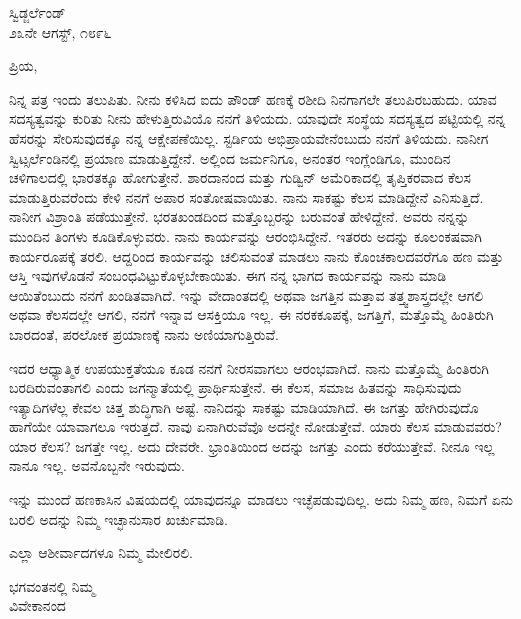 \vspace{-0.5cm}

\begin{flushright}
ಸ್ವಿಡ್ಜರ್ಲೆಂಡ್\\೨೩ನೇ ಆಗಸ್ಟ್, ೧೮೯೬
\end{flushright}

\noindent
ಪ್ರಿಯ,

ನಿನ್ನ ಪತ್ರ ಇಂದು ತಲುಪಿತು. ನೀನು ಕಳಿಸಿದ ಐದು ಪೌಂಡ್ ಹಣಕ್ಕೆ ರಶೀದಿ ನಿನಗಾಗಲೇ ತಲುಪಿರಬಹುದು. ಯಾವ ಸದಸ್ಯತ್ವವನ್ನು ಕುರಿತು ನೀನು ಹೇಳುತ್ತಿರುವಿಯೊ ನನಗೆ ತಿಳಿಯದು. ಯಾವುದೇ ಸಂಸ್ಥೆಯ ಸದಸ್ಯತ್ವದ ಪಟ್ಟಿಯಲ್ಲಿ ನನ್ನ ಹೆಸರನ್ನು ಸೇರಿಸುವುದಕ್ಕೂ ನನ್ನ ಆಕ್ಷೇಪಣೆಯಿಲ್ಲ. ಸ್ಟರ್ಡಿಯ ಅಭಿಪ್ರಾಯವೇನೆಂಬುದು ನನಗೆ ತಿಳಿಯದು. ನಾನೀಗ ಸ್ವಿಟ್ಸರ್ಲೆಂಡಿನಲ್ಲಿ ಪ್ರಯಾಣ ಮಾಡುತ್ತಿದ್ದೇನೆ. ಅಲ್ಲಿಂದ ಜರ್ಮನಿಗೂ, ಅನಂತರ ಇಂಗ್ಲೆಂಡಿಗೂ, ಮುಂದಿನ ಚಳಿಗಾಲದಲ್ಲಿ ಭಾರತಕ್ಕೂ ಹೋಗುತ್ತೇನೆ. ಶಾರದಾನಂದ ಮತ್ತು ಗುಡ್ವಿನ್ ಅಮೆರಿಕಾದಲ್ಲಿ ತೃಪ್ತಿಕರವಾದ ಕೆಲಸ ಮಾಡುತ್ತಿರುವರೆಂದು ಕೇಳಿ ನನಗೆ ಅಪಾರ ಸಂತೋಷವಾಯಿತು. ನಾನು ಸಾಕಷ್ಟು ಕೆಲಸ ಮಾಡಿದ್ದೇನೆ ಎನಿಸುತ್ತಿದೆ. ನಾನೀಗ ವಿಶ್ರಾಂತಿ ಪಡೆಯುತ್ತೇನೆ. ಭರತಖಂಡದಿಂದ ಮತ್ತೊಬ್ಬರನ್ನು ಬರುವಂತೆ ಹೇಳಿದ್ದೇನೆ. ಅವರು ನನ್ನನ್ನು ಮುಂದಿನ ತಿಂಗಳು ಕೂಡಿಕೊಳ್ಳುವರು. ನಾನು ಕಾರ್ಯವನ್ನು ಆರಂಭಿಸಿದ್ದೇನೆ. ಇತರರು ಅದನ್ನು ಕೂಲಂಕಷವಾಗಿ ಕಾರ್ಯರೂಪಕ್ಕೆ ತರಲಿ. ಆದ್ದರಿಂದ ಕಾರ್ಯವನ್ನು ಚಲಿಸುವಂತೆ ಮಾಡಲು ನಾನು ಕೊಂಚಕಾಲದವರೆಗೂ ಹಣ ಮತ್ತು ಆಸ್ತಿ ಇವುಗಳೊಡನೆ ಸಂಬಂಧವಿಟ್ಟುಕೊಳ್ಳಬೇಕಾಯಿತು. ಈಗ ನನ್ನ ಭಾಗದ ಕಾರ್ಯವನ್ನು ನಾನು ಮಾಡಿ ಆಯಿತೆಂಬುದು ನನಗೆ ಖಂಡಿತವಾಗಿದೆ. ಇನ್ನು ವೇದಾಂತದಲ್ಲಿ ಅಥವಾ ಜಗತ್ತಿನ ಮತ್ತಾವ ತತ್ತ್ವಶಾಸ್ತ್ರದಲ್ಲೇ ಆಗಲಿ ಅಥವಾ ಕೆಲಸದಲ್ಲೇ ಆಗಲಿ, ನನಗೆ ಇನ್ನಾವ ಆಸಕ್ತಿಯೂ ಇಲ್ಲ. ಈ ನರಕಕೂಪಕ್ಕೆ, ಜಗತ್ತಿಗೆ, ಮತ್ತೊಮ್ಮೆ ಹಿಂತಿರುಗಿ ಬಾರದಂತೆ, ಪರಲೋಕ ಪ್ರಯಾಣಕ್ಕೆ ನಾನು ಅಣಿಯಾಗುತ್ತಿರುವೆ.

ಇದರ ಆಧ್ಯಾತ್ಮಿಕ ಉಪಯುಕ್ತತೆಯೂ ಕೂಡ ನನಗೆ ನೀರಸವಾಗಲು ಆರಂಭವಾಗಿದೆ. ನಾನು ಮತ್ತೊಮ್ಮೆ ಹಿಂತಿರುಗಿ ಬರದಿರುವಂತಾಗಲಿ ಎಂದು ಜಗನ್ಮಾತೆಯಲ್ಲಿ ಪ್ರಾರ್ಥಿಸುತ್ತೇನೆ. ಈ ಕೆಲಸ, ಸಮಾಜ ಹಿತವನ್ನು ಸಾಧಿಸುವುದು ಇತ್ಯಾದಿಗಳೆಲ್ಲ ಕೇವಲ ಚಿತ್ತ ಶುದ್ಧಿಗಾಗಿ ಅಷ್ಟೆ. ನಾನಿದನ್ನು ಸಾಕಷ್ಟು ಮಾಡಿಯಾಗಿದೆ. ಈ ಜಗತ್ತು ಹೇಗಿರುವುದೊ ಹಾಗೆಯೇ ಯಾವಾಗಲೂ ಇರುತ್ತದೆ. ನಾವು ಏನಾಗಿರುವೆವೊ ಅದನ್ನೇ ನೋಡುತ್ತೇವೆ. ಯಾರು ಕೆಲಸ ಮಾಡುವವರು? ಯಾರ ಕೆಲಸ? ಜಗತ್ತೇ ಇಲ್ಲ. ಅದು ದೇವರೇ. ಭ್ರಾಂತಿಯಿಂದ ಅದನ್ನು ಜಗತ್ತು ಎಂದು ಕರೆಯುತ್ತೇವೆ. ನೀನೂ ಇಲ್ಲ ನಾನೂ ಇಲ್ಲ. ಅವನೊಬ್ಬನೇ ಇರುವುದು.

ಇನ್ನು ಮುಂದೆ ಹಣಕಾಸಿನ ವಿಷಯದಲ್ಲಿ ಯಾವುದನ್ನೂ ಮಾಡಲು ಇಚ್ಛೆಪಡುವುದಿಲ್ಲ. ಅದು ನಿಮ್ಮ ಹಣ, ನಿಮಗೆ ಏನು ಬರಲಿ ಅದನ್ನು ನಿಮ್ಮ ಇಚ್ಛಾನುಸಾರ ಖರ್ಚುಮಾಡಿ.

ಎಲ್ಲಾ ಆಶೀರ್ವಾದಗಳೂ ನಿಮ್ಮ ಮೇಲಿರಲಿ.
\vspace{-0.4cm}

\begin{flushright}
ಭಗವಂತನಲ್ಲಿ ನಿಮ್ಮ\\ವಿವೇಕಾನಂದ
\end{flushright}
\vspace{-0.2cm}

